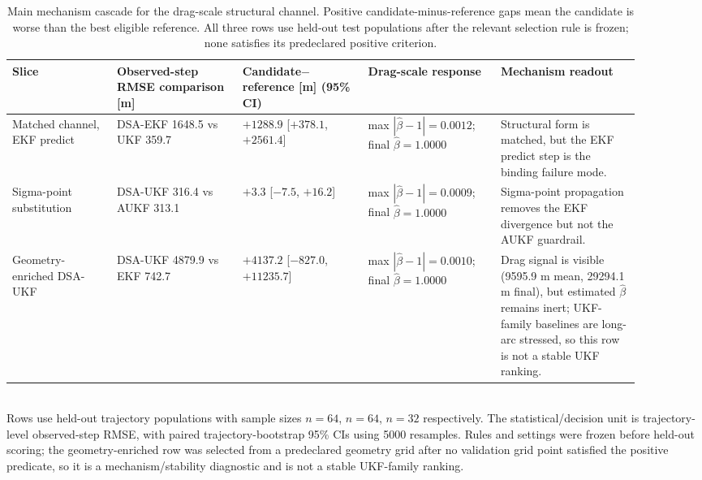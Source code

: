 \begin{table}[t]
  \centering\scriptsize
  \caption{Main mechanism cascade for the drag-scale structural channel. Positive candidate-minus-reference gaps mean the candidate is worse than the best eligible reference. All three rows use held-out test populations after the relevant selection rule is frozen; none satisfies its predeclared positive criterion.}
  \label{tab:main_drag_scale_cascade}
  \begingroup\setlength{\tabcolsep}{3pt}
  \begin{tabular}{@{}p{0.15\linewidth}p{0.18\linewidth}p{0.18\linewidth}p{0.19\linewidth}p{0.20\linewidth}@{}}
    \toprule
    Slice & Observed-step RMSE comparison [m] & Candidate$-$reference [m] (95\% CI) & Drag-scale response & Mechanism readout \\
    \midrule
    Matched channel, EKF predict & DSA-EKF 1648.5 vs UKF 359.7 & $+1288.9$ [$+378.1$, $+2561.4$] & max $|\hat{\beta}-1|=0.0012$; final $\hat{\beta}=1.0000$ & Structural form is matched, but the EKF predict step is the binding failure mode. \\
    Sigma-point substitution & DSA-UKF 316.4 vs AUKF 313.1 & $+3.3$ [$-7.5$, $+16.2$] & max $|\hat{\beta}-1|=0.0009$; final $\hat{\beta}=1.0000$ & Sigma-point propagation removes the EKF divergence but not the AUKF guardrail. \\
    Geometry-enriched DSA-UKF & DSA-UKF 4879.9 vs EKF 742.7 & $+4137.2$ [$-827.0$, $+11235.7$] & max $|\hat{\beta}-1|=0.0010$; final $\hat{\beta}=1.0000$ & Drag signal is visible (9595.9 m mean, 29294.1 m final), but estimated $\hat{\beta}$ remains inert; UKF-family baselines are long-arc stressed, so this row is not a stable UKF ranking. \\
    \bottomrule
  \end{tabular}
  \endgroup
  \\[2pt]{\footnotesize Rows use held-out trajectory populations with sample sizes $n=64$, $n=64$, $n=32$ respectively. The statistical/decision unit is trajectory-level observed-step RMSE, with paired trajectory-bootstrap 95\% CIs using 5000 resamples. Rules and settings were frozen before held-out scoring; the geometry-enriched row was selected from a predeclared geometry grid after no validation grid point satisfied the positive predicate, so it is a mechanism/stability diagnostic and is not a stable UKF-family ranking.}
\end{table}